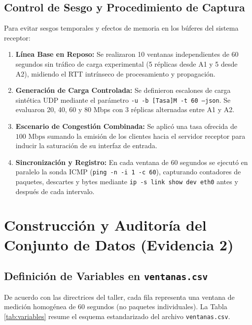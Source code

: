 \documentclass[10pt,twocolumn,letterpaper]{article}
\begin{document}
\subsection{Control de Sesgo y Procedimiento de Captura}
Para evitar sesgos temporales y efectos de memoria en los búferes del sistema receptor:
\begin{enumerate}
    \item \textbf{Línea Base en Reposo:} Se realizaron 10 ventanas independientes de 60 segundos sin tráfico de carga experimental (5 réplicas desde A1 y 5 desde A2), midiendo el RTT intrínseco de procesamiento y propagación.
    \item \textbf{Generación de Carga Controlada:} Se definieron escalones de carga sintética UDP mediante el parámetro \texttt{-u -b [Tasa]M -t 60 --json}. Se evaluaron 20, 40, 60 y 80 Mbps con 3 réplicas alternadas entre A1 y A2.
    \item \textbf{Escenario de Congestión Combinada:} Se aplicó una tasa ofrecida de $100\text{ Mbps}$ sumando la emisión de los clientes hacia el servidor receptor para inducir la saturación de su interfaz de entrada.
    \item \textbf{Sincronización y Registro:} En cada ventana de 60 segundos se ejecutó en paralelo la sonda ICMP (\texttt{ping -n -i 1 -c 60}), capturando contadores de paquetes, descartes y bytes mediante \texttt{ip -s link show dev eth0} antes y después de cada intervalo.
\end{enumerate}

\section{Construcción y Auditoría del Conjunto de Datos (Evidencia 2)}

\subsection{Definición de Variables en \texttt{ventanas.csv}}
De acuerdo con las directrices del taller, cada fila representa una ventana de medición homogénea de 60 segundos (no paquetes individuales). La Tabla \ref{tab:variables} resume el esquema estandarizado del archivo \texttt{ventanas.csv}.
\end{document}
